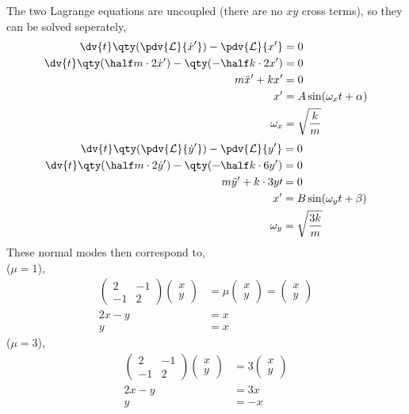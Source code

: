 \begin{example}
The two Lagrange equations are uncoupled (there are no $xy$ cross
terms), so they can be solved seperately,
\begin{align*}
  \dv{t} \qty( \pdv{{\cal L}}{\dot{x}^{\prime}} ) - \pdv{{\cal L}}{x^{\prime}} &= 0 \\
\dv{t} \qty( \half m \cdot 2 \dot{x}^{\prime} ) - \qty( - \half k \cdot 2 x^{\prime} ) &= 0 \\
m \ddot{x}^{\prime} + k x^{\prime} &= 0 \\
x^{\prime} &= A \sin(\omega_x t + \alpha) \\
\omega_x &= \sqrt{\frac{k}{m}}
\end{align*}
\begin{align*}
  \dv{t} \qty( \pdv{{\cal L}}{\dot{y}^{\prime}} ) - \pdv{{\cal L}}{y^{\prime}} &= 0 \\
\dv{t} \qty( \half m \cdot 2 \dot{y}^{\prime} ) - \qty( - \half k \cdot 6 y^{\prime} ) &= 0 \\
m \ddot{y}^{\prime} + k \cdot 3y{\prime} &= 0 \\
x^{\prime} &= B \sin(\omega_y t + \beta) \\
\omega_y &= \sqrt{\frac{3k}{m}}
\end{align*}
These normal modes then correspond to,\\
($\mu=1$), 
\begin{align*}
  \begin{pmatrix}    2 & -1 \\ -1 & 2  \end{pmatrix}
  \begin{pmatrix} x \\ y \end{pmatrix}
  &= \mu
  \begin{pmatrix} x \\ y \end{pmatrix} 
  =
  \begin{pmatrix} x \\ y \end{pmatrix} \\
  2x - y &= x \\
  y &= x
\end{align*}
($\mu=3$),
\begin{align*}
  \begin{pmatrix}2 & -1 \\ -1 & 2 \end{pmatrix}
  \begin{pmatrix}  x \\ y         \end{pmatrix}
  &= 3
  \begin{pmatrix} x \\ y \end{pmatrix} \\
  2x - y &= 3x \\
  y &= -x
\end{align*}
  \end{example}

